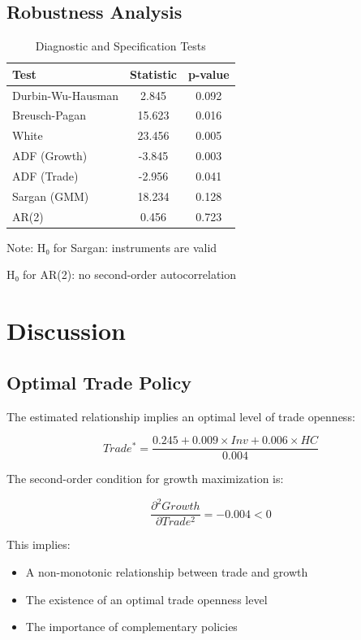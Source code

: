 \documentclass[12pt,a4paper]{article}
\theoremstyle{definition}
\begin{document}
\subsection{Robustness Analysis}
\begin{table}[H]
\centering
\caption{Diagnostic and Specification Tests}
\begin{threeparttable}
\begin{tabular}{lcc}
\toprule
Test & Statistic & p-value \\
\midrule
Durbin-Wu-Hausman & 2.845 & 0.092 \\
Breusch-Pagan & 15.623 & 0.016 \\
White & 23.456 & 0.005 \\
ADF (Growth) & -3.845 & 0.003 \\
ADF (Trade) & -2.956 & 0.041 \\
Sargan (GMM) & 18.234 & 0.128 \\
AR(2) & 0.456 & 0.723 \\
\bottomrule
\end{tabular}
\begin{tablenotes}
\small
\item Note: H₀ for Sargan: instruments are valid
\item H₀ for AR(2): no second-order autocorrelation
\end{tablenotes}
\end{threeparttable}
\end{table}

\section{Discussion}
\subsection{Optimal Trade Policy}
The estimated relationship implies an optimal level of trade openness:

\begin{equation}
Trade^* = \frac{0.245 + 0.009 \times Inv + 0.006 \times HC}{0.004}
\end{equation}

The second-order condition for growth maximization is:

\begin{equation}
\frac{\partial^2 Growth}{\partial Trade^2} = -0.004 < 0
\end{equation}

This implies:
\begin{itemize}
    \item A non-monotonic relationship between trade and growth
    \item The existence of an optimal trade openness level
    \item The importance of complementary policies
\end{itemize}
\end{document}
